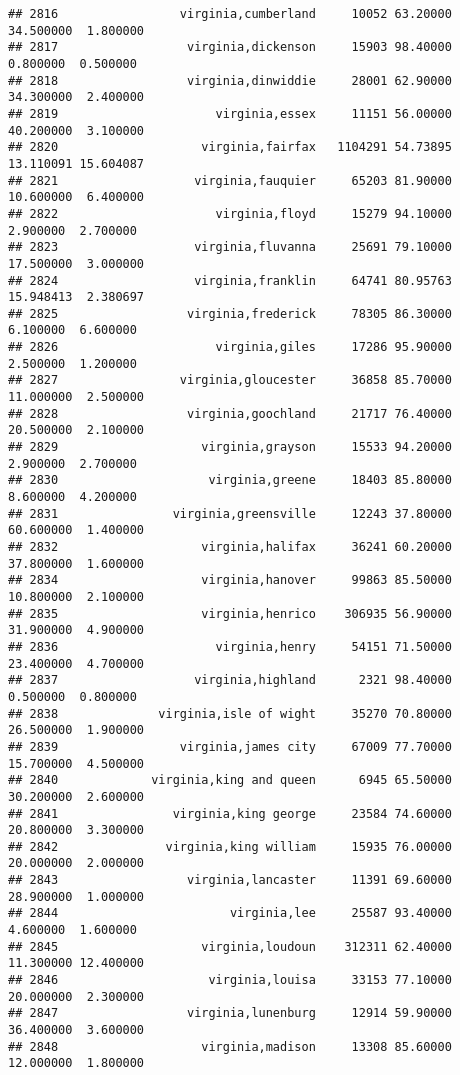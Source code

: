 \documentclass[
]{article}
\begin{document}
\begin{verbatim}
## 2816                 virginia,cumberland     10052 63.20000 34.500000  1.800000
## 2817                  virginia,dickenson     15903 98.40000  0.800000  0.500000
## 2818                  virginia,dinwiddie     28001 62.90000 34.300000  2.400000
## 2819                      virginia,essex     11151 56.00000 40.200000  3.100000
## 2820                    virginia,fairfax   1104291 54.73895 13.110091 15.604087
## 2821                   virginia,fauquier     65203 81.90000 10.600000  6.400000
## 2822                      virginia,floyd     15279 94.10000  2.900000  2.700000
## 2823                   virginia,fluvanna     25691 79.10000 17.500000  3.000000
## 2824                   virginia,franklin     64741 80.95763 15.948413  2.380697
## 2825                  virginia,frederick     78305 86.30000  6.100000  6.600000
## 2826                      virginia,giles     17286 95.90000  2.500000  1.200000
## 2827                 virginia,gloucester     36858 85.70000 11.000000  2.500000
## 2828                  virginia,goochland     21717 76.40000 20.500000  2.100000
## 2829                    virginia,grayson     15533 94.20000  2.900000  2.700000
## 2830                     virginia,greene     18403 85.80000  8.600000  4.200000
## 2831                virginia,greensville     12243 37.80000 60.600000  1.400000
## 2832                    virginia,halifax     36241 60.20000 37.800000  1.600000
## 2834                    virginia,hanover     99863 85.50000 10.800000  2.100000
## 2835                    virginia,henrico    306935 56.90000 31.900000  4.900000
## 2836                      virginia,henry     54151 71.50000 23.400000  4.700000
## 2837                   virginia,highland      2321 98.40000  0.500000  0.800000
## 2838              virginia,isle of wight     35270 70.80000 26.500000  1.900000
## 2839                 virginia,james city     67009 77.70000 15.700000  4.500000
## 2840             virginia,king and queen      6945 65.50000 30.200000  2.600000
## 2841                virginia,king george     23584 74.60000 20.800000  3.300000
## 2842               virginia,king william     15935 76.00000 20.000000  2.000000
## 2843                  virginia,lancaster     11391 69.60000 28.900000  1.000000
## 2844                        virginia,lee     25587 93.40000  4.600000  1.600000
## 2845                    virginia,loudoun    312311 62.40000 11.300000 12.400000
## 2846                     virginia,louisa     33153 77.10000 20.000000  2.300000
## 2847                  virginia,lunenburg     12914 59.90000 36.400000  3.600000
## 2848                    virginia,madison     13308 85.60000 12.000000  1.800000

\end{verbatim}
\end{document}

